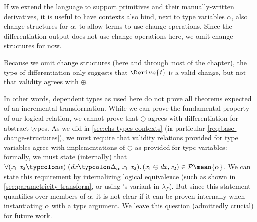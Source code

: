 
If we extend the language to support primitives and their manually-written
derivatives, it is useful to have contexts also bind,
next to type variables \ensuremath{\alpha}, also change structures for \ensuremath{\alpha}, to
allow terms to use change operations. Since the differentiation output does not
use change operations here, we omit change structures for now.

\begin{remark}
  \label{rem:validity-oplus-system-f-not-really}
Because we omit change structures (here and through most of the chapter),
the type of differentiation only suggests that \ensuremath{\Derive{\Varid{t}}} is a valid change, but
not that validity agrees with \ensuremath{\oplus }.

In other words, dependent types as used
here do not prove all theorems expected of an incremental transformation.
While we can prove the fundamental property
of our logical relation, we cannot prove that \ensuremath{\oplus } agrees with
differentiation for abstract types. As we did in \cref{sec:chs-types-contexts} (in
particular \cref{req:base-change-structures}), we must require that validity
relations provided for type variables agree with implementations of \ensuremath{\oplus } as
provided for type variables: formally, we must state (internally) that
\ensuremath{\forall (\Varid{x}_{1}\;\Varid{x}_{2}\typcolon\alpha)\hsforall \;(\Varid{dx}\typcolon\Delta_\alpha\;\Varid{x}_{1}\;\Varid{x}_{2})\hsdot{\circ }{\mathpunct{.}}(\Varid{x}_{1}\oplus \Varid{dx},\Varid{x}_{2})\in \mathcal{P}\mean{\alpha}}.
We can state this requirement by internalizing
logical equivalence (such as shown in \cref{sec:parametricity-transform}, or
using \citet{Bernardy10}'s variant in \ensuremath{\lambda_P}). But since this statement
quantifies over members of \ensuremath{\alpha}, it is not clear if it can be proven
internally when instantiating \ensuremath{\alpha} with a type argument. We leave this
question (admittedly crucial) for future work.
%
\end{remark}

